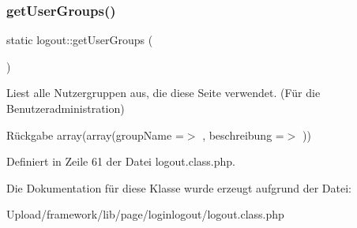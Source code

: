 \subsubsection{\texorpdfstring{get\+User\+Groups()}{getUserGroups()}}
{\footnotesize\ttfamily static logout\+::get\+User\+Groups (\begin{DoxyParamCaption}{ }\end{DoxyParamCaption})\hspace{0.3cm}{\ttfamily [static]}}

Liest alle Nutzergruppen aus, die diese Seite verwendet. (Für die Benutzeradministration) \begin{DoxyReturn}{Rückgabe}
array(array(\textquotesingle{}group\+Name\textquotesingle{} =$>$ \textquotesingle{}\textquotesingle{}, \textquotesingle{}beschreibung\textquotesingle{} =$>$ \textquotesingle{}\textquotesingle{})) 
\end{DoxyReturn}


Definiert in Zeile 61 der Datei logout.\+class.\+php.



Die Dokumentation für diese Klasse wurde erzeugt aufgrund der Datei\+:\begin{DoxyCompactItemize}
\item 
Upload/framework/lib/page/loginlogout/logout.\+class.\+php\end{DoxyCompactItemize}
